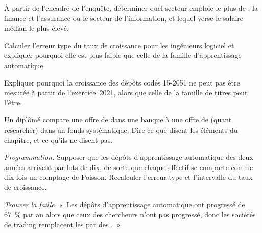 \begin{exercise}[$\star$]\label{exo:in:machine-learning-and-data-engineer:3}
À partir de l'encadré de l'enquête, déterminer quel secteur emploie le plus de , la finance et l'assurance ou le secteur de l'information, et
lequel verse le salaire médian le plus élevé.
\end{exercise}

\begin{exercise}[$\star\star$]\label{exo:in:machine-learning-and-data-engineer:4}
Calculer l'erreur type du taux de croissance pour les ingénieurs logiciel et expliquer pourquoi elle est
plus faible que celle de la famille d'apprentissage automatique.
\end{exercise}

\begin{exercise}[$\star\star$]\label{exo:in:machine-learning-and-data-engineer:5}
Expliquer pourquoi la croissance des dépôts codés 15-2051 ne peut pas être mesurée à partir de l'exercice~2021, alors que celle de la famille de titres peut l'être.
\end{exercise}

\begin{exercise}[$\star\star$]\label{exo:in:machine-learning-and-data-engineer:6}
Un diplômé compare une offre de  dans une banque à une offre de  (quant researcher) dans un fonds systématique.
Dire ce que disent les éléments du chapitre, et ce qu'ils ne disent pas.
\end{exercise}

\begin{exercise}[$\star\star\star$]\label{exo:in:machine-learning-and-data-engineer:7}
\emph{Programmation.} Supposer que les dépôts d'apprentissage automatique des deux années arrivent par lots de dix, de sorte que
chaque effectif se comporte comme dix fois un comptage de Poisson. Recalculer l'erreur type et l'intervalle du taux de croissance.
\end{exercise}

\begin{exercise}[$\star\star\star$]\label{exo:in:machine-learning-and-data-engineer:8}
\emph{Trouver la faille.} «~Les dépôts d'apprentissage automatique ont progressé de 67~\% par an alors que ceux des chercheurs n'ont pas progressé, donc les sociétés de trading
remplacent les  par des .~»
\end{exercise}

